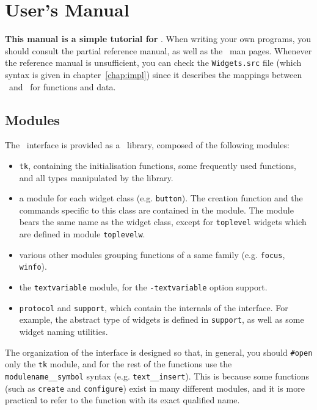 \chapter{User's Manual}
{\bf This manual is a simple tutorial for \camltk }.  When writing your own
programs, you should consult the partial reference manual, as well as the
\tk\ man pages.  Whenever the reference manual is unsufficient, you can
check the \verb|Widgets.src| file (which syntax is given in
chapter~\ref{chap:impl}) since it describes the mappings between
\tk\ and \caml\ for functions and data. 

\section{Modules}
The \camltk\ interface is provided as a \caml\ library, composed of the
following modules:

\begin{itemize}
\item \verb|tk|, containing the initialisation functions, some frequently
used functions, and all types manipulated by the library.

\item a module for each widget class (e.g. \verb|button|). The creation
function and the commands specific to this class are contained in the
module. The module bears the same name as the widget class, except for
\verb|toplevel| widgets which are defined in module \verb|toplevelw|.

\item various other modules grouping functions of a same family
(e.g. \verb|focus|, \verb|winfo|). 

\item the \verb|textvariable| module, for the \verb|-textvariable| option
support. 

\item \verb|protocol| and \verb|support|, which contain the internals
of the interface. For example, the abstract type of widgets is defined in
\verb|support|, as well as some widget naming utilities.
\end{itemize} 

The organization of the interface is designed so that, in general, you
should \verb|#open| only the \verb|tk| module, and for the 
rest of the functions use the \verb|modulename__symbol| syntax (e.g.
\verb|text__insert|).
This is because some functions (such as \verb|create| and \verb|configure|)
exist in many different modules, and it is more practical to refer to the
function with its exact qualified name.

